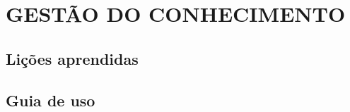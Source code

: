 \chapter{GESTÃO DO CONHECIMENTO}
\label{chap:conhec}

\section{Lições aprendidas}
\label{sec:licap}

\section{Guia de uso}
\label{sec:guia}

